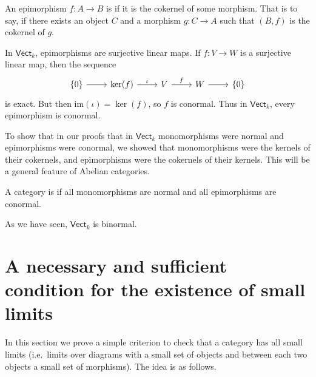 \documentclass[main.tex]{subfiles}
\begin{document}
\begin{definition}
  \label{def:conormalepimorphism}
  An epimorphism $f\colon A \to B$ is  if it is the cokernel of some morphism. That is to say, if there exists an object $C$ and a morphism $g\colon C \to A$ such that $(B, f)$ is the cokernel of $g$.
\end{definition}

\begin{example}
  In $\mathsf{Vect}_{k}$, epimorphisms are surjective linear maps. If $f\colon V \to W$ is a surjective linear map, then the sequence
  \begin{equation*}
    \begin{tikzcd}
      \{0\} \arrow[r] & \ker(f) \arrow[r, "\iota"] & V \arrow[r, "f"] & W \arrow[r] & \{0\}
    \end{tikzcd}
  \end{equation*}
  is exact. But then $\mathrm{im}(\iota) = \ker(f)$, so $f$ is conormal. Thus in $\mathsf{Vect}_{k}$, every epimorphism is conormal.
\end{example}

\begin{note}
  To show that in our proofs that in $\mathsf{Vect}_{k}$ monomorphisms were normal and epimorphisms were conormal, we showed that monomorphisms were the kernels of their cokernels, and epimorphisms were the cokernels of their kernels. This will be a general feature of Abelian categories.
\end{note}

\begin{definition}
  \label{def:binormalcategory}
  A category is  if all monomorphisms are normal and all epimorphisms are conormal.
\end{definition}

\begin{example}
  As we have seen, $\mathsf{Vect}_{k}$ is binormal.
\end{example}


\section{A necessary and sufficient condition for the existence of small limits}

In this section we prove a simple criterion to check that a category has all small limits (i.e.\ limits over diagrams with a small set of objects and between each two objects a small set of morphisms). The idea is as follows.
\end{document}
